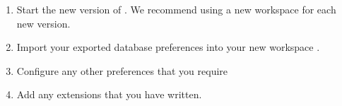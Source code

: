 \begin{enumerate}
\item Start the new version of \app{}. We recommend using a new workspace for each new version. 
\item Import your exported database preferences into your new workspace  .
\item Configure any other preferences that you require
\item Add any extensions that you have written. 
\end{enumerate}
